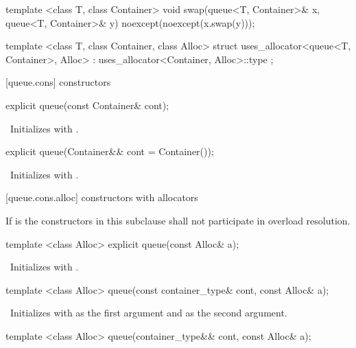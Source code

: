 \begin{codeblock}
{  template <class T, class Container>
    void swap(queue<T, Container>& x, queue<T, Container>& y) noexcept(noexcept(x.swap(y)));

  template <class T, class Container, class Alloc>
    struct uses_allocator<queue<T, Container>, Alloc>
      : uses_allocator<Container, Alloc>::type { };
}
\end{codeblock}

[queue.cons]{ constructors}

\begin{itemdecl}
explicit queue(const Container& cont);
\end{itemdecl}

\begin{itemdescr}
\pnum
\effects\ Initializes  with .
\end{itemdescr}

\begin{itemdecl}
explicit queue(Container&& cont = Container());
\end{itemdecl}

\begin{itemdescr}
\pnum
\effects\ Initializes  with .
\end{itemdescr}

[queue.cons.alloc]{ constructors with allocators}

\pnum
If  is 
the constructors in this subclause shall not participate in overload resolution.

\begin{itemdecl}
template <class Alloc> explicit queue(const Alloc& a);
\end{itemdecl}

\begin{itemdescr}
\pnum
\effects\ Initializes  with .
\end{itemdescr}

\begin{itemdecl}
template <class Alloc> queue(const container_type& cont, const Alloc& a);
\end{itemdecl}

\begin{itemdescr}
\pnum
\effects\ Initializes  with  as the first argument and 
as the second argument.
\end{itemdescr}

\begin{itemdecl}
template <class Alloc> queue(container_type&& cont, const Alloc& a);
\end{itemdecl}

